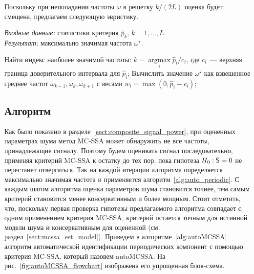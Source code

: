 \documentclass[specialist,
substylefile = spbu_report.rtx,
subf,12pt]{disser}
\newcommand{\Input}{\emph{Входные данные: }}
\newcommand{\Output}{\emph{Результат: }}
\theoremstyle{definition}
\begin{document}
Поскольку при непопадании частоты $\omega$ в решетку $k/(2L)$ оценка будет смещена, предлагаем следующую эвристику.

\begin{algorithm}[H]
	\caption{Оценка максимально значимой частоты с помощью MC-SSA}\label{alg:signif_freq_est}
	\Input статистики критерия $\widehat{p}_k$, $k=1,\ldots,L$.\\
	\Output максимально значимая частота $\omega^\star$.

	\begin{algorithmic}[1]
		\State Найти индекс наиболее значимой частоты: $k=\operatorname*{argmax}\limits_i \widehat{p}_i / c_i$, где $c_i$~--- верхняя граница доверительного интервала для $\widehat{p}_i$;
		\State Вычислить значение $\omega^\star$ как взвешенное среднее частот $\omega_{k-1}, \omega_k,\omega_{k+1}$ с весами $w_i=\max(0, \widehat{p}_i-c_i)$;
	\end{algorithmic}
\end{algorithm}

\subsection{Алгоритм}

Как было показано в разделе~\ref{sect:composite_signal_power}, при оцененных параметрах шума метод MC-SSA может обнаружить не все частоты, принадлежащие сигналу. Поэтому будем оценивать сигнал последовательно, применяя критерий MC-SSA к остатку до тех пор, пока гипотеза $H_0:\mathsf{S}=0$ не перестанет отвергаться. Так на каждой итерации алгоритма определяется максимально значимая частота и применяется алгоритм~\ref{alg:auto_periodic}. С каждым шагом алгоритма оценка параметров шума становится точнее, тем самым критерий становится менее консервативным и более мощным. Стоит отметить, что, поскольку первая проверка гипотезы предлагаемого алгоритма совпадает с одним применением критерия MC-SSA, критерий остается точным для истинной модели шума и консервативным для оцененной (см. раздел~\ref{sect:mcssa_est_model}). Приведем в алгоритме~\ref{alg:autoMCSSA} алгоритм автоматической идентификации периодических компонент с помощью критерия MC-SSA, который назовем autoMCSSA. На рис.~\ref{fig:autoMCSSA_flowchart} изображена его упрощенная блок-схема.
\end{document}
